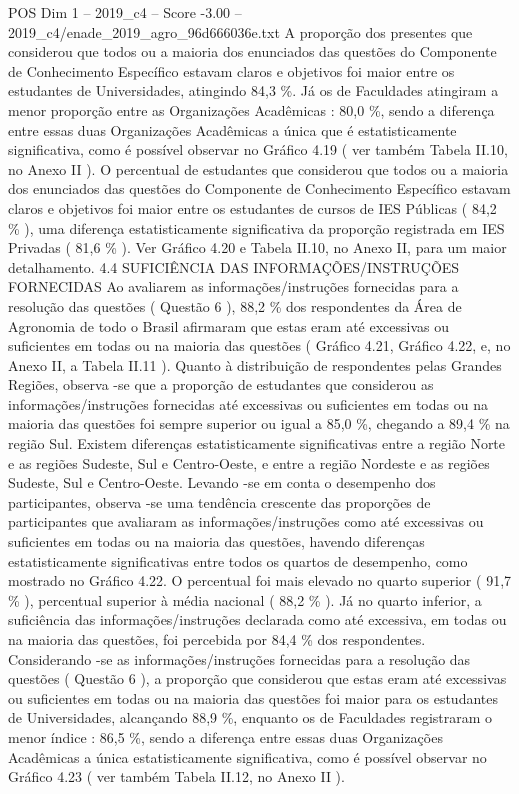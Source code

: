 \begin{textsample}{POS Dim 1 – 2019\_c4 – Score -3.00 – 2019\_c4/enade\_2019\_agro\_96d666036e.txt}
A proporção dos presentes que considerou que todos ou a maioria dos enunciados das questões do Componente de Conhecimento Específico estavam claros e objetivos foi maior entre os estudantes de Universidades, atingindo 84,3 \%.
Já os de Faculdades atingiram a menor proporção entre as Organizações Acadêmicas : 80,0 \%, sendo a diferença entre essas duas Organizações Acadêmicas a única que é estatisticamente significativa, como é possível observar no Gráfico 4.19 ( ver também Tabela II.10, no Anexo II ).
O percentual de estudantes que considerou que todos ou a maioria dos enunciados das questões do Componente de Conhecimento Específico estavam claros e objetivos foi maior entre os estudantes de cursos de IES Públicas ( 84,2 \% ), uma diferença estatisticamente significativa da proporção registrada em IES Privadas ( 81,6 \% ).
Ver Gráfico 4.20 e Tabela II.10, no Anexo II, para um maior detalhamento. 4.4 SUFICIÊNCIA DAS INFORMAÇÕES/INSTRUÇÕES FORNECIDAS Ao avaliarem as informações/instruções fornecidas para a resolução das questões ( Questão 6 ), 88,2 \% dos respondentes da Área de Agronomia de todo o Brasil afirmaram que estas eram até excessivas ou suficientes em todas ou na maioria das questões ( Gráfico 4.21, Gráfico 4.22, e, no Anexo II, a Tabela II.11 ).
Quanto à distribuição de respondentes pelas Grandes Regiões, observa -se que a proporção de estudantes que considerou as informações/instruções fornecidas até excessivas ou suficientes em todas ou na maioria das questões foi sempre superior ou igual a 85,0 \%, chegando a 89,4 \% na região Sul.
Existem diferenças estatisticamente significativas entre a região Norte e as regiões Sudeste, Sul e Centro-Oeste, e entre a região Nordeste e as regiões Sudeste, Sul e Centro-Oeste.
Levando -se em conta o desempenho dos participantes, observa -se uma tendência crescente das proporções de participantes que avaliaram as informações/instruções como até excessivas ou suficientes em todas ou na maioria das questões, havendo diferenças estatisticamente significativas entre todos os quartos de desempenho, como mostrado no Gráfico 4.22.
O percentual foi mais elevado no quarto superior ( 91,7 \% ), percentual superior à média nacional ( 88,2 \% ).
Já no quarto inferior, a suficiência das informações/instruções declarada como até excessiva, em todas ou na maioria das questões, foi percebida por 84,4 \% dos respondentes.
Considerando -se as informações/instruções fornecidas para a resolução das questões ( Questão 6 ), a proporção que considerou que estas eram até excessivas ou suficientes em todas ou na maioria das questões foi maior para os estudantes de Universidades, alcançando 88,9 \%, enquanto os de Faculdades registraram o menor índice : 86,5 \%, sendo a diferença entre essas duas Organizações Acadêmicas a única estatisticamente significativa, como é possível observar no Gráfico 4.23 ( ver também Tabela II.12, no Anexo II ).

\end{textsample}
